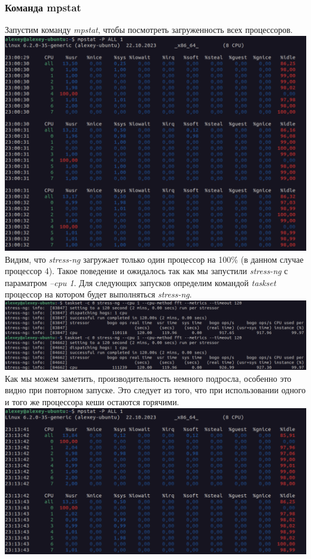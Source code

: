 \documentclass[12pt,onecolumn]{article}
\begin{document}
\subsubsection{Команда mpstat}
Запустим команду \textit{mpstat}, чтобы посмотреть загруженность всех процессоров.\\
\includegraphics[width=\textwidth]{image/mpstat.png}
Видим, что \textit{stress-ng} загружает только один процессор на 100\% (в данном случае процессор 4).
Такое поведение и ожидалось так как мы запустили \textit{stress-ng} с параматром \textit{--cpu 1}.
Для следующих запусков определим командой \textit{taskset} процессор на котором будет выполняться \textit{stress-ng}.\\
\includegraphics[width=\textwidth]{image/taskset.png}
Как мы можем заметить, производительность немного подросла, особенно это видно при повторном запуске. Это следует из того, что при использовании одного и того же процессора кеши остаются горячими.\\ 
\includegraphics[width=\textwidth]{image/mpstat2.png}
\end{document}

